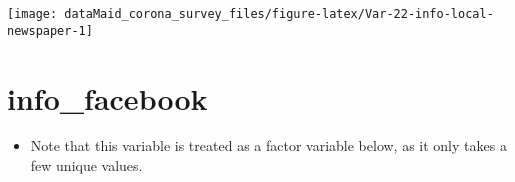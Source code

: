 \documentclass[
]{report}
\providecommand{\tightlist}{%
  \setlength{\itemsep}{0pt}\setlength{\parskip}{0pt}}
\begin{document}
\begin{minipage}{0.25 \textwidth}

\begin{center}\texttt{[image: dataMaid\_corona\_survey\_files/figure-latex/Var-22-info-local-newspaper-1]} \end{center}

\end{minipage}

\noindent\makebox[\linewidth]{\rule{\textwidth}{0.4pt}}

\hypertarget{info_facebook}{%
\section{info\_facebook}\label{info_facebook}}

\begin{itemize}
\tightlist
\item
  Note that this variable is treated as a factor variable below, as it
  only takes a few unique values.
\end{itemize}
\end{document}
